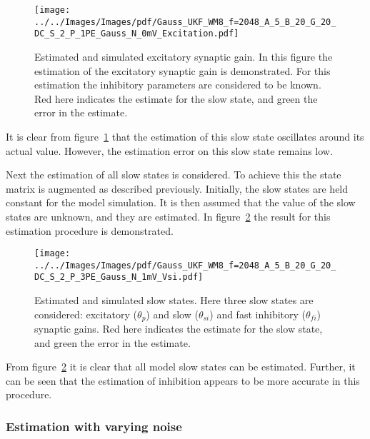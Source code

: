 \begin{figure}
	\centering
		\texttt{[image: ../../Images/Images/pdf/Gauss\_UKF\_WM8\_f=2048\_A\_5\_B\_20\_G\_20\_DC\_S\_2\_P\_1PE\_Gauss\_N\_0mV\_Excitation.pdf]}
	\caption{Estimated and simulated excitatory synaptic gain. In this figure the estimation of the excitatory synaptic gain is demonstrated. For this estimation the inhibitory parameters are considered to be known. Red here indicates the estimate for the slow state, and green the error in the estimate.}
	\label{fig: ESTOSFP}
\end{figure}

It is clear from figure~\ref{fig: ESTOSFP} that the estimation of this slow state oscillates around its actual value. However, the estimation error on this slow state remains low.


Next the estimation of all slow states is considered. To achieve this the state matrix is augmented as described previously. Initially, the slow states are held constant for the model simulation. It is then assumed that the value of the slow states are unknown, and they are estimated. In figure~\ref{fig: ESTMP3} the result for this estimation procedure is demonstrated.
\begin{figure}%
	\centering
		\texttt{[image: ../../Images/Images/pdf/Gauss\_UKF\_WM8\_f=2048\_A\_5\_B\_20\_G\_20\_DC\_S\_2\_P\_3PE\_Gauss\_N\_1mV\_Vsi.pdf]}
	\caption{Estimated and simulated slow states. Here three slow states are considered: excitatory ($\theta_{p}$) and slow ($\theta_{si}$) and fast inhibitory ($\theta_{fi}$) synaptic gains. Red here indicates the estimate for the slow state, and green the error in the estimate.}
	\label{fig: ESTMP3}
\end{figure}%


From figure~\ref{fig: ESTMP3} it is clear that all model slow states can be estimated. Further, it can be seen that the estimation of inhibition appears to be more accurate in this procedure.

\subsubsection{Estimation with varying noise}


